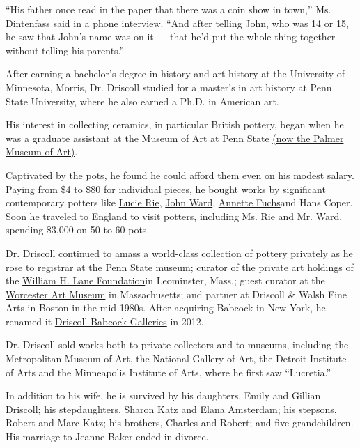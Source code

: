 ``His father once read in the paper that there was a coin show in
town,'' Ms. Dintenfass said in a phone interview. ``And after telling
John, who was 14 or 15, he saw that John's name was on it --- that he'd
put the whole thing together without telling his parents.''

After earning a bachelor's degree in history and art history at the
University of Minnesota, Morris, Dr. Driscoll studied for a master's in
art history at Penn State University, where he also earned a Ph.D. in
American art.

His interest in collecting ceramics, in particular British pottery,
began when he was a graduate assistant at the Museum of Art at Penn
State \href{https://palmermuseum.psu.edu/}{(now the Palmer Museum of
Art)}.

Captivated by the pots, he found he could afford them even on his modest
salary. Paying from \$4 to \$80 for individual pieces, he bought works
by significant contemporary potters like
\href{http://www.artnet.com/artists/lucie-rie/}{Lucie Rie},
\href{https://www.oxfordceramics.com/artists/89-john-ward/overview/}{John
Ward},
\href{https://www.20thcenturyforum.com/t11375-annette-fuchs}{Annette
Fuchs}and Hans Coper. Soon he traveled to England to visit potters,
including Ms. Rie and Mr. Ward, spending \$3,000 on 50 to 60 pots.

Dr. Driscoll continued to amass a world-class collection of pottery
privately as he rose to registrar at the Penn State museum; curator of
the private art holdings of the
\href{https://www.mfa.org/give/gifts-art/lane-collection}{William H.
Lane Foundation}in Leominster, Mass.; guest curator at the
\href{https://www.worcesterart.org/}{Worcester Art Museum} in
Massachusetts; and partner at Driscoll \& Walsh Fine Arts in Boston in
the mid-1980s. After acquiring Babcock in New York, he renamed it
\href{http://www.driscollbabcock.com/}{Driscoll Babcock Galleries} in
2012.

Dr. Driscoll sold works both to private collectors and to museums,
including the Metropolitan Museum of Art, the National Gallery of Art,
the Detroit Institute of Arts and the Minneapolis Institute of Arts,
where he first saw ``Lucretia.''

In addition to his wife, he is survived by his daughters, Emily and
Gillian Driscoll; his stepdaughters, Sharon Katz and Elana Amsterdam;
his stepsons, Robert and Marc Katz; his brothers, Charles and Robert;
and five grandchildren. His marriage to Jeanne Baker ended in divorce.

